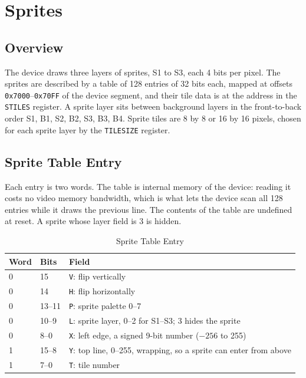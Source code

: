 \chapter{Sprites}
\label{ch:sprites}

\section{Overview}

The device draws three layers of sprites, S1 to S3, each 4 bits per pixel. The sprites are described by a table of 128
entries of 32 bits each, mapped at offsets \texttt{0x7000}--\texttt{0x70FF} of the device segment, and their tile data
is at the address in the \texttt{STILES} register. A sprite layer sits between background layers in the front-to-back
order S1, B1, S2, B2, S3, B3, B4. Sprite tiles are 8 by 8 or 16 by 16 pixels, chosen for each sprite layer by the
\texttt{TILESIZE} register.

\section{Sprite Table Entry}
\label{sec:sprite-entry}

Each entry is two words. The table is internal memory of the device: reading it costs no video memory bandwidth, which
is what lets the device scan all 128 entries while it draws the previous line. The contents of the table are undefined
at reset. A sprite whose layer field is 3 is hidden.

\begin{table}[H]
	\centering
	\begin{tabular}{llp{7.5cm}}
		\toprule
		\textbf{Word} & \textbf{Bits} & \textbf{Field}                                                           \\
		\midrule
		0             & 15            & \texttt{V}: flip vertically                                              \\
		0             & 14            & \texttt{H}: flip horizontally                                            \\
		0             & 13--11        & \texttt{P}: sprite palette 0--7                                          \\
		0             & 10--9         & \texttt{L}: sprite layer, 0--2 for S1--S3; 3 hides the sprite            \\
		0             & 8--0          & \texttt{X}: left edge, a signed 9-bit number ($-256$ to 255)             \\
		1             & 15--8         & \texttt{Y}: top line, 0--255, wrapping, so a sprite can enter from above \\
		1             & 7--0          & \texttt{T}: tile number                                                  \\
		\bottomrule
	\end{tabular}
	\caption{Sprite Table Entry}
	\label{tab:sprite-entry}
\end{table}

